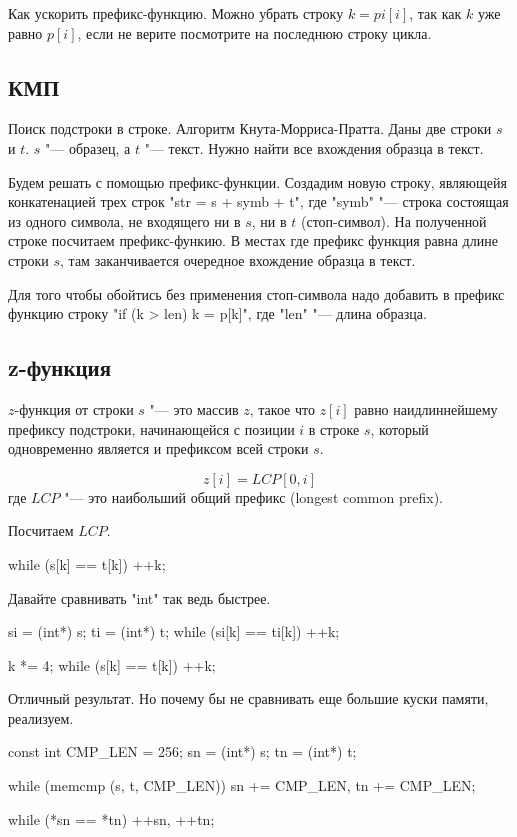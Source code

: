 Как ускорить префикс-функцию.
Можно убрать строку $k = pi[i]$, так как $k$ уже равно $p[i]$, если не верите посмотрите на последнюю строку цикла.

\subsection{КМП}
Поиск подстроки в строке. Алгоритм Кнута-Морриса-Пратта.
Даны две строки $s$ и $t$. $s$ "--- образец, а $t$ "--- текст. 
Нужно найти все вхождения образца в текст. 

Будем решать с помощью префикс-функции. 
Создадим новую строку, являющейя конкатенацией трех строк \cpp"str = s + symb + t", где \cpp"symb" "--- строка состоящая из одного символа, не входящего ни в $s$, ни в $t$ (стоп-символ). 
На полученной строке посчитаем префикс-функию. 
В местах где префикс функция равна длине строки $s$, там заканчивается очередное вхождение образца в текст.

Для того чтобы обойтись без применения стоп-символа надо добавить в префикс функцию строку \cpp"if (k > len) k = p[k]", где \cpp"len" "--- длина образца.

\subsection{z-функция}
$z$-функция от строки $s$ "--- это массив $z$, такое что $z[i]$ равно наидлиннейшему префиксу подстроки, начинающейся с позиции $i$ в строке $s$, который одновременно является и префиксом всей строки $s$.

$$z[i] = LCP[0,i]$$
где $LCP$ "--- это наибольший общий префикс (longest common prefix).

Посчитаем $LCP$.

\begin{cppcode}
while (s[k] == t[k])
  ++k;
\end{cppcode}

Давайте сравнивать \cpp"int" так ведь быстрее.

\begin{cppcode}
si = (int*) s;
ti = (int*) t;
while (si[k] == ti[k])
  ++k;

k *= 4;
while (s[k] == t[k])
  ++k;
\end{cppcode} 

Отличный результат. 
Но почему бы не сравнивать еще большие куски памяти, реализуем.


\begin{cppcode}
const int CMP_LEN = 256;
sn = (int*) s;
tn = (int*) t;

while (memcmp (s, t, CMP_LEN))
  sn += CMP_LEN, 
  tn += CMP_LEN;

while (*sn == *tn)
  ++sn, 
  ++tn;
\end{cppcode} 

